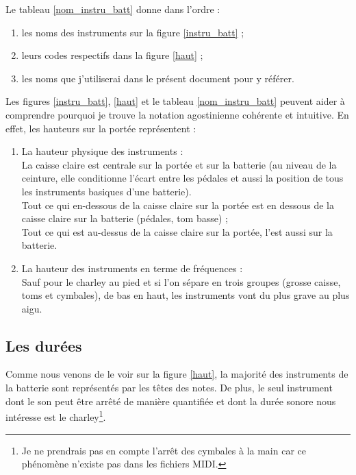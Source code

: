 Le tableau \ref{nom_instru_batt} donne dans l’ordre :
\begin{enumerate}
    \item les noms des instruments sur la figure \ref{instru_batt} ;
    \item leurs codes respectifs dans la figure \ref{haut} ;
    \item les noms que j’utiliserai dans le présent document pour y référer.
\end{enumerate}
Les figures \ref{instru_batt}, \ref{haut} et le tableau \ref{nom_instru_batt}
peuvent aider à comprendre pourquoi je trouve la notation agostinienne
cohérente et intuitive. En effet, les hauteurs sur la portée représentent :
\begin{enumerate}
	\item La hauteur physique des instruments :\\
	La caisse claire est centrale sur la portée et sur la batterie (au niveau
    de la ceinture, elle conditionne l’écart entre les pédales et aussi la
    position de tous les instruments basiques d’une batterie).\\
	Tout ce qui en-dessous de la caisse claire sur la portée est en dessous de
    la caisse claire sur la batterie (pédales, tom basse) ;\\
	Tout ce qui est au-dessus de la caisse claire sur la portée, l’est aussi
    sur la batterie.\\
	\item La hauteur des instruments en terme de fréquences :\\
	Sauf pour le charley au pied et si l’on sépare en trois groupes
    (grosse caisse, toms et cymbales), de bas en haut, les instruments vont du
    plus grave au plus aigu.
\end{enumerate}

\subsection*{Les durées}
\label{hho}
Comme nous venons de le voir sur la figure \ref{haut}, la majorité des
instruments de la batterie sont représentés par les têtes des notes. De plus, le seul instrument dont le son
peut être arrêté de manière quantifiée et dont la durée sonore nous intéresse
est le charley\footnote{Je ne prendrais pas en compte l’arrêt des cymbales à la
main car ce phénomène n’existe pas dans les fichiers MIDI.}.

